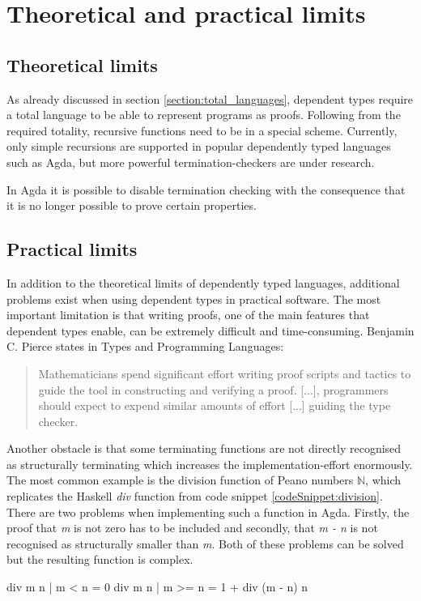 \section{Theoretical and practical limits}\label{section:limits}
\subsection{Theoretical limits}
As already discussed in section \ref{section:total_languages}, dependent types require a total language to be able to represent programs as proofs.
Following from the required totality, recursive functions need to be in a special scheme.
Currently, only simple recursions are supported in popular dependently typed languages such as Agda, but more powerful termination-checkers are under research.

In Agda it is possible to disable termination checking with the consequence that it is no longer possible to prove certain properties.
\subsection{Practical limits}
In addition to the theoretical limits of dependently typed languages, additional problems exist when using dependent types in practical software.
The most important limitation is that writing proofs, one of the main features that dependent types enable, can be extremely difficult and time-consuming.
Benjamin C. Pierce states in Types and Programming Languages\cite{10.5555/509043}:
\begin{quote}
Mathematicians spend significant effort writing proof scripts and tactics to guide the tool in constructing and verifying a proof. [...], programmers should expect to expend similar amounts of effort [...] guiding the type checker. 
\end{quote}

Another obstacle is that some terminating functions are not directly recognised as structurally terminating which increases the implementation-effort enormously.
The most common example is the division function of Peano numbers $\mathbb{N}$, which replicates the Haskell \emph{div} function from code snippet \ref{codeSnippet:division}.
There are two problems when implementing such a function in Agda. Firstly, the proof that \emph{m} is not zero has to be included and secondly, that \emph{m - n} is not recognised as structurally smaller than \emph{m}. Both of these problems can be solved but the resulting function is complex.
\begin{codesnippet}[mathescape=true, caption={Definition of div function in Haskell}, label={codeSnippet:division}]
div m n | m < n = 0
div m n | m >= n = 1 + div (m - n) n
\end{codesnippet}

